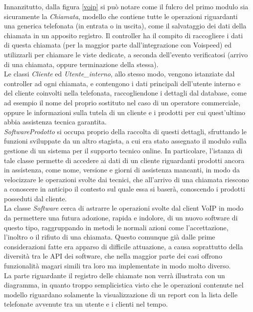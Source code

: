 \noindent
Innanzitutto, dalla figura \ref{voip} si pu\`o notare come il fulcro del primo modulo sia sicuramente la \textit{Chiamata}, modello che contiene tutte le operazioni riguardanti una generica telefonata (in entrata o in uscita), come il salvataggio dei dati della chiamata in un apposito registro. Il controller ha il compito di raccogliere i dati di questa chiamata (per la maggior parte dall'integrazione con Voispeed) ed utilizzarli per chiamare le viste dedicate, a seconda dell'evento verificatosi (arrivo di una chiamata, oppure terminazione della stessa). \\
Le classi \textit{Cliente} ed \textit{Utente\_interno}, allo stesso modo, vengono istanziate dal controller ad ogni chiamata, e contengono i dati principali dell'utente interno e del cliente coinvolti nella telefonata, raccogliendone i dettagli dal database, come ad esempio il nome del proprio sostituto nel caso di un operatore commerciale, oppure le informazioni sulla tutela di un cliente e i prodotti per cui quest'ultimo abbia assistenza tecnica garantita. \\
\textit{SoftwareProdotto} si occupa proprio della raccolta di questi dettagli, sfruttando le funzioni sviluppate da un altro stagista, a cui era stato assegnato il modulo sulla gestione di un sistema per il supporto tecnico online. In particolare, l'istanza di tale classe permette di accedere ai dati di un cliente riguardanti prodotti ancora in assistenza, come nome, versione e giorni di assistenza mancanti, in modo da velocizzare le operazioni svolte dai tecnici, che all'arrivo di una chiamata riescono a conoscere in anticipo il contesto sul quale essa si baser\`a, conoscendo i prodotti posseduti dal cliente. \\
La classe \textit{Software} cerca di astrarre le operazioni svolte dal client VoIP in modo da permettere una futura adozione, rapida e  indolore, di un nuovo software di questo tipo, raggruppando in metodi le normali azioni come l'accettazione, l'inoltro o il rifiuto di una chiamata. Questo comunque gi\`a dalle prime considerazioni fatte era apparso di difficile attuazione, a causa soprattutto della diversit\`a tra le API dei software, che nella maggior parte dei casi offrono funzionalit\`a magari simili tra loro ma implementate in modo molto diverso. \\
La parte riguardante il registro delle chiamate non verr\`a illustrata con un diagramma, in quanto troppo semplicistica visto che le operazioni contenute nel modello riguardano solamente la visualizzazione di un report con la lista delle telefonate avvenute tra un utente e i clienti nel tempo.\\
